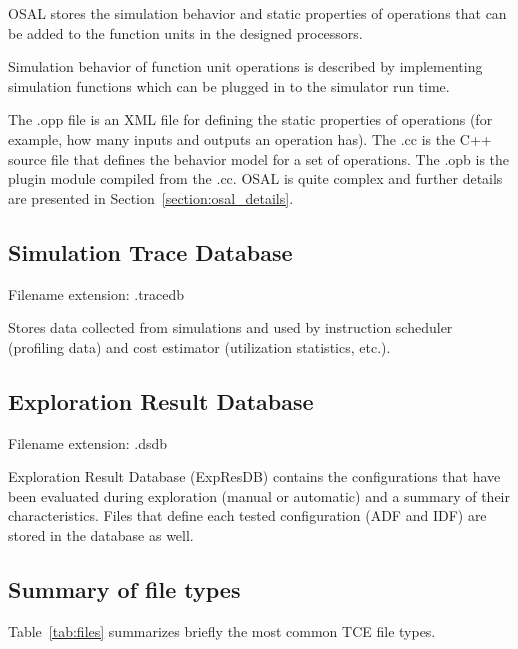 \documentclass[twoside]{tceusermanual}
\begin{document}
OSAL stores the simulation behavior and static properties of operations 
that can be added to the function units in the designed processors.

Simulation behavior of function unit operations is described by implementing
simulation functions which can be plugged in to the simulator run time.

The .opp file is an XML file for defining the static properties of
operations (for example, how many inputs and outputs an operation
has). The .cc is the C++ source file that defines the behavior model
for a set of operations. The .opb is the plugin module compiled from
the .cc.  OSAL is quite complex and further details are presented in
Section~\ref{section:osal_details}.


\subsection{Simulation Trace Database}
\label{sec:tracedb}

Filename extension: .tracedb

Stores data collected from simulations and used by instruction scheduler
(profiling data) and cost estimator (utilization statistics, etc.).

\subsection{Exploration Result Database}
\label{sec:expresdb}

Filename extension: .dsdb

Exploration Result Database (ExpResDB) contains the configurations that have
been evaluated during exploration (manual or automatic) and a summary of
their characteristics. Files that define each tested configuration (ADF and
IDF) are stored in the database as well. 



\subsection{Summary of file types}
\label{sec:summary}

Table~\ref{tab:files} summarizes briefly the most common TCE file types.
\end{document}

